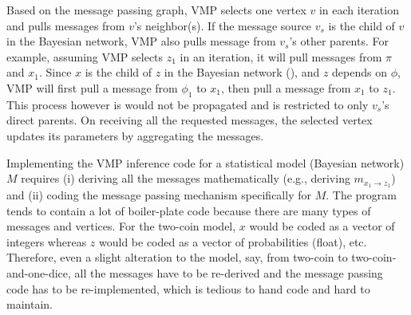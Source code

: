 Based on the message passing graph,
VMP selects one vertex $v$ in each iteration and 
pulls messages from $v$'s neighbor(s).
If the message source $v_s$ is the child of $v$ in the Bayesian network,
VMP also pulls message from $v_s$'s other parents. 
For example, assuming VMP selects $z_1$ in an iteration,
it will pull messages from $\pi$ and $x_1$.
Since $x$ is the child of $z$ in the Bayesian network (), 
and $z$ depends on $\phi$,
VMP will first pull a message from $\phi_1$ to $x_1$,
then pull a message from $x_1$ to $z_1$.
This process however is would not be propagated and is restricted to 
only $v_s$'s direct parents.
On receiving all the requested messages, 
the selected vertex updates its parameters by aggregating the messages. 

Implementing the VMP inference code for a statistical model 
(Bayesian network) $M$
requires (i) deriving all the messages mathematically  (e.g., deriving $m_{x_1 \rightarrow z_1}$)
and (ii) coding the message passing mechanism specifically for $M$.
The program tends to contain a lot of boiler-plate code 
because there are many types of messages and vertices.
For the two-coin model, 
$x$ would be coded as a vector of integers 
whereas $z$ would be coded as a vector of probabilities (float), etc.
Therefore, even a slight alteration to the model, say, from two-coin to 
two-coin-and-one-dice, all the messages have to be re-derived 
and the message passing code has to be re-implemented, which is tedious
to hand code and hard to maintain.


%

